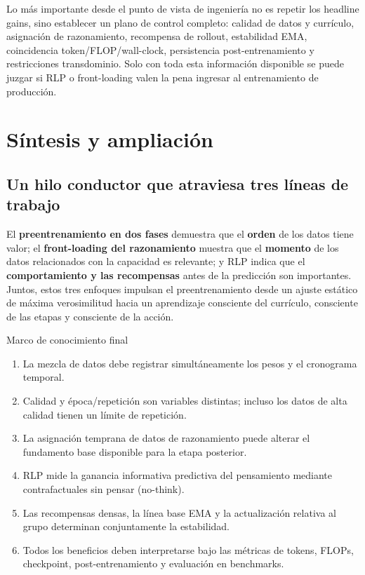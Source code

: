 \documentclass[a4paper]{article}
\begin{document}
Lo más importante desde el punto de vista de ingeniería no es repetir los headline gains, sino establecer un plano de control completo: calidad de datos y currículo, asignación de razonamiento, recompensa de rollout, estabilidad EMA, coincidencia token/FLOP/wall-clock, persistencia post-entrenamiento y restricciones transdominio. Solo con toda esta información disponible se puede juzgar si RLP o front-loading valen la pena ingresar al entrenamiento de producción.
\section{Síntesis y ampliación}

\subsection{Un hilo conductor que atraviesa tres líneas de trabajo}

El \textbf{preentrenamiento en dos fases} demuestra que el \textbf{orden} de los datos tiene valor; el \textbf{front-loading del razonamiento} muestra que el \textbf{momento} de los datos relacionados con la capacidad es relevante; y RLP indica que el \textbf{comportamiento y las recompensas} antes de la predicción son importantes. Juntos, estos tres enfoques impulsan el preentrenamiento desde un ajuste estático de máxima verosimilitud hacia un aprendizaje consciente del currículo, consciente de las etapas y consciente de la acción.

\begin{importantbox}{Marco de conocimiento final}
\begin{enumerate}
  \item La mezcla de datos debe registrar simultáneamente los pesos y el cronograma temporal.
  \item Calidad y época/repetición son variables distintas; incluso los datos de alta calidad tienen un límite de repetición.
  \item La asignación temprana de datos de razonamiento puede alterar el fundamento base disponible para la etapa posterior.
  \item RLP mide la ganancia informativa predictiva del pensamiento mediante contrafactuales sin pensar (no-think).
  \item Las recompensas densas, la línea base EMA y la actualización relativa al grupo determinan conjuntamente la estabilidad.
  \item Todos los beneficios deben interpretarse bajo las métricas de tokens, FLOPs, checkpoint, post-entrenamiento y evaluación en benchmarks.
\end{enumerate}
\end{importantbox}
\end{document}

